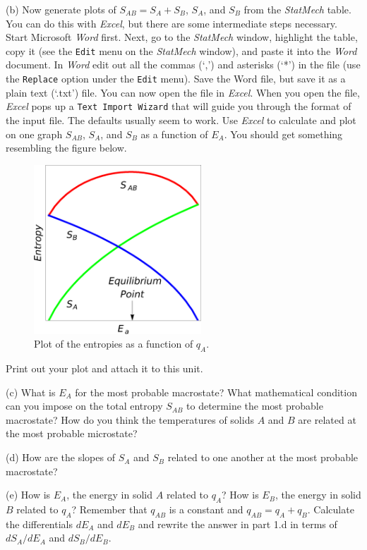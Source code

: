(b) Now generate plots of $S_{AB}=S_A + S_B$, $S_A$, and $S_B$ from the {\it StatMech} table.
You can do this with {\it Excel}, but there are some intermediate steps necessary.
Start Microsoft {\it Word} first.
Next, go to the {\it StatMech} window, highlight the table, copy it
 (see the {\tt Edit} menu on the {\it StatMech} window), and paste it into the {\it Word}
document. 
In {\it Word} edit out all the commas (`,') and asterisks (`*') in the file 
(use the {\tt Replace}
option under the {\tt Edit} menu).
Save the Word file, but save it as a plain text (`\*.txt') file.
You can now open the file in {\it Excel}.
When you open the file, {\it Excel} pops up a {\tt Text Import Wizard} 
that will guide you through
the format of the input file.
The defaults usually seem to work.
Use {\it Excel} to calculate and plot on one graph $S_{AB}$, $S_A$, and $S_B$
as a function of $E_A$.
You should get something resembling the figure below.
\begin{figure}[hb!]
\begin{center}
\includegraphics[height=2.5in]{entropy_temperature/NumberOfStates5.eps}
\caption{Plot of the entropies as a function of $q_A$.}
\end{center}
\end{figure}
Print out your plot and attach it to this unit.

(c) What is $E_A$ for the most probable macrostate? What mathematical condition can you impose
on the total entropy $S_{AB}$ to determine the most probable macrostate?
How do you think the temperatures of solids $A$ and $B$ are related at the most probable 
microstate?
\vspace{15mm}

(d) How are the slopes of $S_A$ and $S_B$ related to one another at the most probable
macrostate?
\vspace{40mm}

(e) How is $E_A$, the energy in solid $A$ related to $q_A$?
How is $E_B$, the energy in solid $B$ related to $q_A$?
Remember that $q_{AB}$ is a constant and $q_{AB} = q_A + q_B$.
Calculate the differentials $dE_A$ and $dE_B$ and rewrite the answer in part 1.d
in terms of $dS_A/dE_A$ and $dS_B/dE_B$.
\vspace{55mm}

